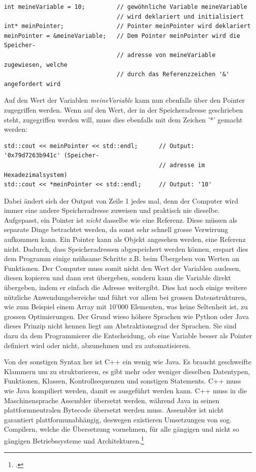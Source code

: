 \documentclass[titlepage, 11pt, a4paper, ngerman]{article}
\begin{document}
\pagebreak
\begin{verbatim}
int meineVariable = 10;         // gewöhnliche Variable meineVariable
                                // wird deklariert und initialisiert
int* meinPointer;               // Pointer meinPointer wird deklariert
meinPointer = &meineVariable;   // Dem Pointer meinPointer wird die Speicher-
                                // adresse von meineVariable zugewiesen, welche
                                // durch das Referenzzeichen '&' angefordert wird
\end{verbatim}
\bigbreak
Auf den Wert der Variablen \textit{meineVariable} kann nun ebenfalls über den Pointer zugegriffen werden. Wenn auf den Wert, der in der Speicheradresse geschrieben steht, zugegriffen werden will, muss dies ebenfalls mit dem Zeichen '*' gemacht werden:
\begin{verbatim}
std::cout << meinPointer << std::endl;      // Output: '0x79d7263b941c' (Speicher-
                                            // adresse im Hexadezimalsystem)
std::cout << *meinPointer << std::endl;     // Output: '10'
\end{verbatim}
\bigbreak
Dabei ändert sich der Output von Zeile 1 jedes mal, denn der Computer wird immer eine andere Speicheradresse zuweisen und praktisch nie dieselbe. Aufgepasst, ein Pointer ist \textit{nicht} dasselbe wie eine Referenz. Diese müssen als separate Dinge betrachtet werden, da sonst sehr schnell grosse Verwirrung aufkommen kann. Ein Pointer kann als Objekt angesehen werden, eine Referenz nicht. Dadurch, dass Speicheradressen abgespeichert werden können, erspart dies dem Programm einige mühsame Schritte z.B. beim Übergeben von Werten an Funktionen. Der Computer muss somit nicht den Wert der Variablen auslesen, diesen kopieren und dann erst übergeben, sondern kann die Variable direkt übergeben, indem er einfach die Adresse weitergibt. Dies hat noch einige weitere nützliche Anwendungsbereiche und führt vor allem bei grossen Datenstrukturen, wie zum Beispiel einem Array mit 10'000 Elementen, was keine Seltenheit ist, zu grossen Optimierungen. Der Grund wieso höhere Sprachen wie Python oder Java dieses Prinzip nicht kennen liegt am Abstraktionsgrad der Sprachen. Sie sind dazu da dem Programmierer die Entscheidung, ob eine Variable besser als Pointer definiert wird oder nicht, abzunehmen und zu automatisieren.\par
Von der sonstigen Syntax her ist C++ ein wenig wie Java. Es braucht geschweifte Klammern um zu strukturieren, es gibt mehr oder weniger dieselben Datentypen, Funktionen, Klassen, Kontrollsequenzen und sonstigen Statements. C++ muss wie Java kompiliert werden, damit es ausgeführt werden kann. C++ muss in die Maschinensprache \gls{Assembler} übersetzt werden, während Java in seinen plattformneutralen Bytecode übersetzt werden muss. \gls{Assembler} ist nicht garantiert plattformunabhängig, deswegen existieren Umsetzungen von sog. \gls{Compiler}n, welche die Übersetzung vornehmen, für alle gängigen und nicht so gängigen Betriebssysteme und Architekturen.\footcite{assembler-independence}\par
\end{document}
